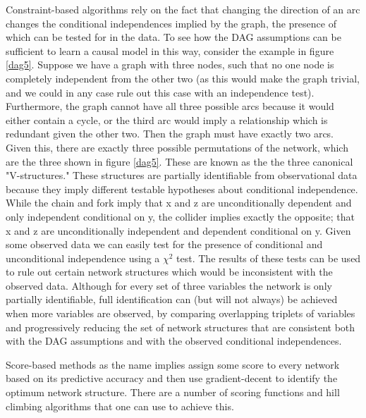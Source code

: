 \documentclass{article}
\begin{document}
Constraint-based algorithms rely on the fact that changing the direction of an arc changes the conditional independences implied by the graph, the presence of which can be tested for in the data. To see how the DAG assumptions can be sufficient to learn a causal model in this way, consider the example in figure \ref{dag5}. Suppose we have a graph with three nodes, such that no one node is completely independent from the other two (as this would make the graph trivial, and we could in any case rule out this case with an independence test). Furthermore, the graph cannot have all three possible arcs because it would either contain a cycle, or the third arc would imply a relationship which is redundant given the other two. Then the graph must have exactly two arcs. Given this, there are exactly three possible permutations of the network, which are the three shown in figure \ref{dag5}. These are known as the the three canonical "V-structures." \parencite{pearl2014probabilistic} These structures are partially identifiable from observational data because they imply different testable hypotheses about conditional independence. While the chain and fork imply that x and z are unconditionally dependent and only independent conditional on y, the collider implies exactly the opposite; that x and z are unconditionally independent and dependent conditional on y. Given some observed data we can easily test for the presence of conditional and unconditional independence using a $\chi^2$ test. The results of these tests can be used to rule out certain network structures which would be inconsistent with the observed data. Although for every set of three variables the network is only partially identifiable, full identification can (but will not always) be achieved when more variables are observed, by comparing overlapping triplets of variables and progressively reducing the set of network structures that are consistent both with the DAG assumptions and with the observed conditional independences.

Score-based methods as the name implies assign some score to every network based on its predictive accuracy and then use gradient-decent to identify the optimum network structure. There are a number of scoring functions and hill climbing algorithms that one can use to achieve this. 
\end{document}
